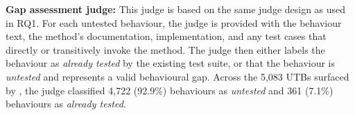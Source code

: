 \smallskip
\noindent\textbf{Gap assessment judge:} This judge is based on the same judge design as used in RQ1. 
For each untested behaviour, the judge is provided with the behaviour text, the method's documentation, implementation, and any test cases that directly or transitively invoke the method.
The judge then either labels the behaviour as \textit{already tested} by the existing test suite, or that the behaviour is \textit{untested} and represents a valid behavioural gap.
Across the 5,083 UTBs surfaced by \toolname{}, the judge classified 4,722 (92.9\%) behaviours as \textit{untested} and 361 (7.1\%) behaviours as \textit{already tested}.



